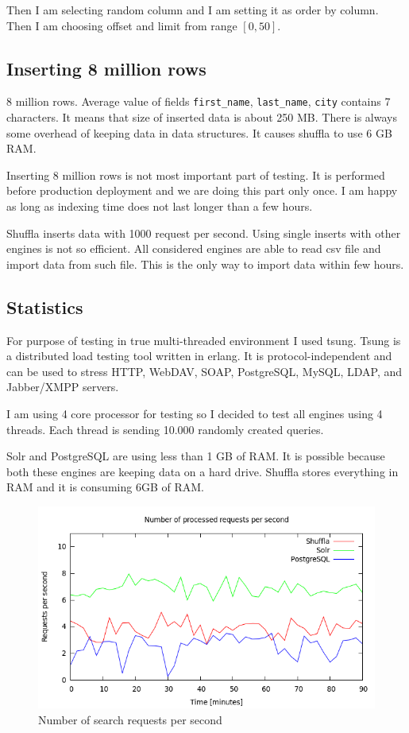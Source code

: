 \documentclass[10pt,a4paper]{article}
\begin{document}
Then I am selecting random column and I am setting it as order by column. Then I am choosing offset and limit from range $[0, 50]$.

\subsection{Inserting 8 million rows}

8 million rows. Average value of fields \verb|first_name|, \verb|last_name|, \verb|city| contains 7 characters. It means that size of inserted data is about 250 MB. There is always some overhead of keeping data in data structures. It causes shuffla to use 6 GB RAM.

Inserting 8 million rows is not most important part of testing. It is performed before production deployment and we are doing this part only once. I am happy as long as indexing time does not last longer than a few hours. 

Shuffla inserts data with 1000 request per second. Using single inserts with other engines is not so efficient. All considered engines are able to read csv file and import data from such file. This is the only way to import data within few hours.

\subsection{Statistics}

For purpose of testing in true multi-threaded environment I used tsung. Tsung is a distributed load testing tool written in erlang. It is protocol-independent and can be used to stress HTTP, WebDAV, SOAP, PostgreSQL, MySQL, LDAP, and Jabber/XMPP servers. 

I am using 4 core processor for testing so I decided to test all engines using 4 threads. Each thread is sending 10.000 randomly created queries. 

Solr and PostgreSQL are using less than 1 GB of RAM. It is possible because both these engines are keeping data on a hard drive. Shuffla stores everything in RAM and it is consuming 6GB of RAM. 

\begin{figure}
\centering
  \includegraphics[width=12cm]{request_count_tn}
  \caption{Number of search requests per second}
  \label{fig:request_count_tn}
\end{figure}
\end{document}
